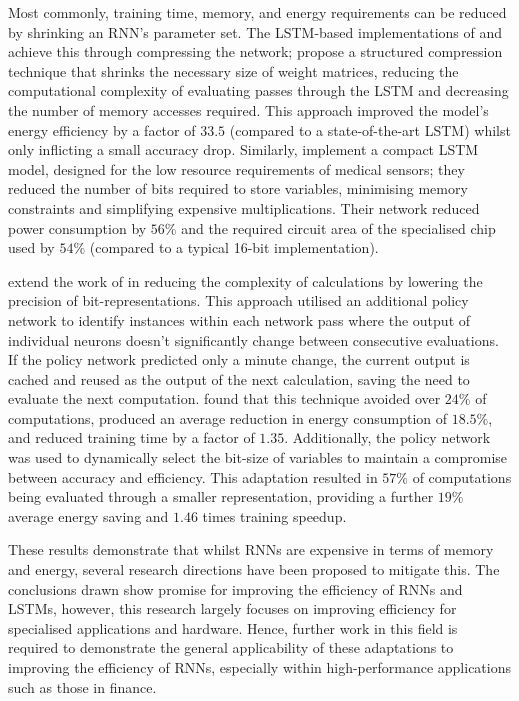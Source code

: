 \documentclass[a4paper, 11pt]{report}
\begin{document}
    Most commonly, training time, memory, and energy requirements can be reduced by shrinking an RNN's parameter set. The LSTM-based implementations of \citet{wang-2018} and \citet{chen-2022} achieve this through compressing the network; \citet{wang-2018} propose a structured compression technique that shrinks the necessary size of weight matrices, reducing the computational complexity of evaluating passes through the LSTM and decreasing the number of memory accesses required. This approach improved the model's energy efficiency by a factor of $33.5$ (compared to a state-of-the-art LSTM) whilst only inflicting a small accuracy drop. Similarly, \citet{chen-2022} implement a compact LSTM model, designed for the low resource requirements of medical sensors; they reduced the number of bits required to store variables, minimising memory constraints and simplifying expensive multiplications. Their network reduced power consumption by $56\%$ and the required circuit area of the specialised chip used by $54\%$ (compared to a typical 16-bit implementation).

    \citet{feliz-2021} extend the work of \citet{chen-2022} in reducing the complexity of calculations by lowering the precision of bit-representations. This approach utilised an additional policy network to identify instances within each network pass where the output of individual neurons doesn't significantly change between consecutive evaluations. If the policy network predicted only a minute change, the current output is cached and reused as the output of the next calculation, saving the need to evaluate the next computation. \citet{feliz-2021} found that this technique avoided over $24\%$ of computations, produced an average reduction in energy consumption of $18.5\%$, and reduced training time by a factor of $1.35$. Additionally, the policy network was used to dynamically select the bit-size of variables to maintain a compromise between accuracy and efficiency. This adaptation resulted in $57\%$ of computations being evaluated through a smaller representation, providing a further $19\%$ average energy saving and $1.46$ times training speedup.

    These results demonstrate that whilst RNNs are expensive in terms of memory and energy, several research directions have been proposed to mitigate this. The conclusions drawn show promise for improving the efficiency of RNNs and LSTMs, however, this research largely focuses on improving efficiency for specialised applications and hardware. Hence, further work in this field is required to demonstrate the general applicability of these adaptations to improving the efficiency of RNNs, especially within high-performance applications such as those in finance.
\end{document}
